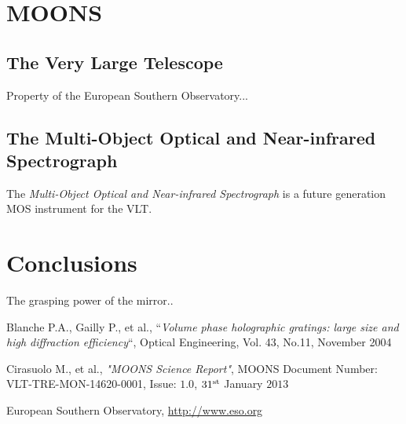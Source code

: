 \documentclass[Lau, oneside]{sapthesis}%
\begin{document}
\chapter{MOONS}
\label{chap:2}
\section{The Very Large Telescope}
Property of the European Southern Observatory...

\section{The Multi-Object Optical and Near-infrared Spectrograph}
\label{sec:moons}

The \textit{Multi-Object Optical and Near-infrared Spectrograph} is a future generation MOS instrument for the VLT. 

\chapter{Conclusions}
\label{chap:3}
The grasping power of the mirror..

\backmatter
{}
\begin{thebibliography}{17}

Blanche P.A., Gailly P., et al., “\textit{Volume phase holographic gratings: large size and high diffraction efficiency}“, Optical Engineering, Vol. 43, No.11, November 2004

Cirasuolo M., et al., \textit{"MOONS Science Report"}, MOONS Document Number: VLT-TRE-MON-14620-0001, Issue: $1.0$, $31^{\textup{st}}$ January $2013$

European Southern Observatory, \url{http://www.eso.org}

\end{thebibliography}
\end{document}
